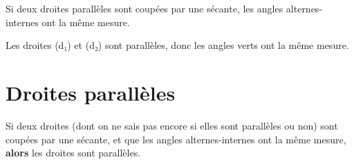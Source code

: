 \documentclass[a4paper,11pt]{article}
\begin{document}
\begin{cours}
	Si deux droites parallèles sont coupées par une sécante, les angles alternes-internes ont la même mesure.
\end{cours}

\begin{exemple}
	\begin{minipage}[c]{0.45\textwidth}
	\end{minipage} \hspace{1em}
	\begin{minipage}{0.45\textwidth}
		Les droites (d₁) et (d₂) sont parallèles, donc les angles {\color{Green} verts} ont la même mesure.
	\end{minipage}
\end{exemple}

\section{Droites parallèles}

\begin{cours}
	Si deux droites (dont on ne sais pas encore si elles sont parallèles ou non) sont coupées par une sécante, et que les angles alternes-internes ont la même mesure, \textbf{alors} les droites sont parallèles.
\end{cours}
\end{document}
